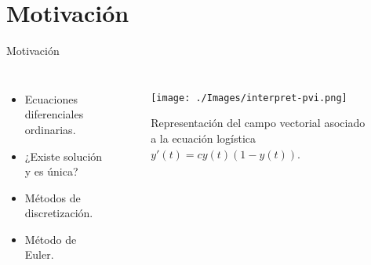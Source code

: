 
\section{Motivación}

{
	
	\begin{frame}{Motivación}
		\begin{columns}
			\begin{itemize}
				\item Ecuaciones diferenciales ordinarias.
				\item ¿Existe solución y es única?
				\item Métodos de discretización.
				\item Método de Euler.		
			\end{itemize}
			
			
			\begin{figure}[h]
				\centering
				\texttt{[image: ./Images/interpret-pvi.png]}
					\caption{Representación del campo vectorial asociado a la ecuación logística $y'(t) = c y(t) (1 - y(t))$.} 
			\end{figure}
		\end{columns}			
	\end{frame}
}
		
